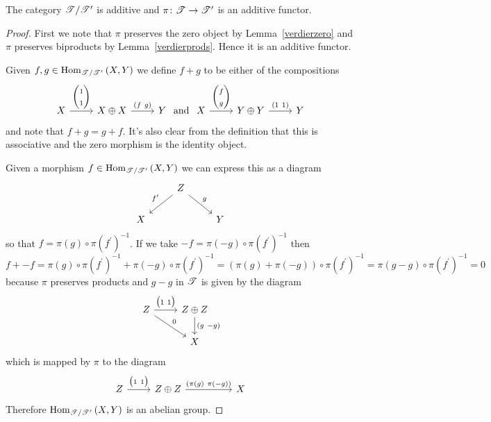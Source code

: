 \documentclass[dissertation.tex]{subfiles}
\begin{document}
\begin{lem}
  The category $\mathscr{T}/\mathscr{T}^\prime$ is additive and $\pi \colon \mathscr{T} \to \mathscr{T}^\prime$ is an additive functor.
  
  \begin{proof}
    First we note that $\pi$ preserves the zero object by Lemma~\ref{verdierzero} and $\pi$ preserves biproducts by Lemma~\ref{verdierprods}.  Hence it is an additive functor.
    
    Given $f,g \in \operatorname{Hom}_{\mathscr{T}/\mathscr{T}^\prime}\left(X,Y\right)$ we define $f + g$ to be either of the compositions
    $$\begin{tikzcd}
      X \arrow{r}{\left(\begin{matrix}1\\1\end{matrix}\right)} & X \oplus X \arrow{r}{\left(f\ g\right)} & Y
    \end{tikzcd}
    \ \text{and}\ 
    \begin{tikzcd}
      X \arrow{r}{\left(\begin{matrix}f\\g\end{matrix}\right)} & Y \oplus Y \arrow{r}{\left(1\ 1\right)} & Y
    \end{tikzcd}$$
    and note that $f + g = g + f$.
    It's also clear from the definition that this is associative and the zero morphism is the identity object.
    
    Given a morphism $f \in \operatorname{Hom}_{\mathscr{T}/\mathscr{T}^\prime}\left(X,Y\right)$ we can express this as a diagram
    $$\begin{tikzcd}
      & Z \arrow[swap]{ld}{f^\prime}\arrow{rd}{g}\\
      X & & Y
    \end{tikzcd}$$
    so that $f = \pi(g)\circ\pi(f^\prime)^{-1}$.
    If we take $-f = \pi(-g)\circ\pi(f^\prime)^{-1}$ then
    $$f + -f = \pi(g)\circ \pi(f^\prime)^{-1} + \pi(-g)\circ\pi(f^\prime)^{-1} 
    = \left(\pi(g) + \pi(-g)\right)\circ\pi(f^\prime)^{-1} = \pi(g - g)\circ \pi(f^\prime)^{-1} = 0$$
    because $\pi$ preserves products and $g - g$ in $\mathscr{T}$ is given by the diagram
    $$\begin{tikzcd}
      Z \arrow{rd}{0}\arrow{r}{\left(\begin{matrix}1\ 1\end{matrix}\right)} & Z \oplus Z \arrow{d}{\left(g\ -g\right)}\\
      & X
    \end{tikzcd}$$
    which is mapped by $\pi$ to the diagram
    $$\begin{tikzcd}
      Z \arrow{r}{\left(\begin{matrix}1\ 1\end{matrix}\right)} & Z \oplus Z \arrow{rr}{\left(\pi(g)\ \pi(-g)\right)} && X
    \end{tikzcd}$$
    Therefore $\operatorname{Hom}_{\mathscr{T}/\mathscr{T}^\prime}\left(X,Y\right)$ is an abelian group.
  \end{proof}
\end{lem}
\end{document}
